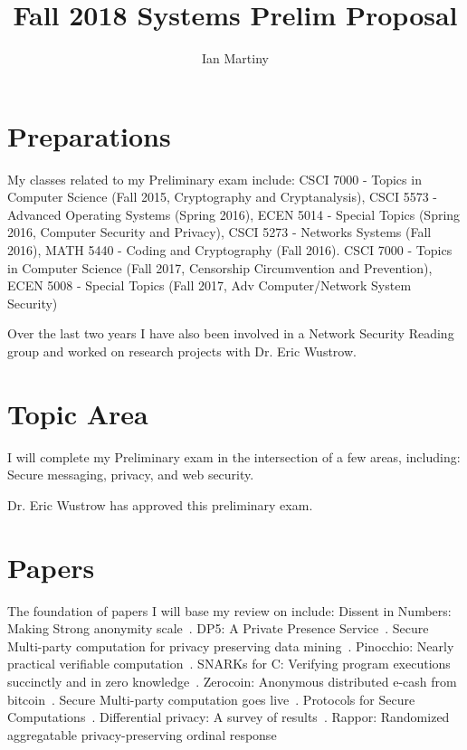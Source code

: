 \documentclass{article}
\title{Fall 2018 Systems Prelim Proposal}
\author{Ian Martiny}
\begin{document}
\maketitle
\section{Preparations}
My classes related to my Preliminary exam include: CSCI 7000 - Topics in
Computer Science (Fall 2015, Cryptography and Cryptanalysis), CSCI 5573 -
Advanced Operating Systems (Spring 2016), ECEN 5014 - Special Topics (Spring
2016, Computer Security and Privacy), CSCI 5273 - Networks Systems (Fall 2016),
MATH 5440 - Coding and Cryptography (Fall 2016). CSCI 7000 - Topics in Computer
Science (Fall 2017, Censorship Circumvention and Prevention), ECEN 5008 -
Special Topics (Fall 2017, Adv Computer/Network System Security)

Over the last two years I have also been involved in a Network Security Reading
group and worked on research projects with Dr. Eric Wustrow.

\section{Topic Area}
I will complete my Preliminary exam in the intersection of a few areas,
including: Secure messaging, privacy, and web security.

Dr. Eric Wustrow has approved this preliminary exam.

\section{Papers}
The foundation of papers I will base my review on include: Dissent in Numbers:
  Making Strong anonymity scale~\cite{wolinsky2012dissent}. DP5: A Private
  Presence Service~\cite{borisov2015dp5}. Secure Multi-party computation for
  privacy preserving data mining~\cite{lindell2005secure}. Pinocchio: Nearly
  practical verifiable computation~\cite{parno2016pinocchio}. SNARKs for C:
  Verifying program executions succinctly and in zero
  knowledge~\cite{ben2013snarks}. Zerocoin: Anonymous distributed e-cash from
  bitcoin~\cite{miers2013zerocoin}. Secure Multi-party computation goes
  live~\cite{bogetoft2009secure}. Protocols for Secure
  Computations~\cite{yao1982protocols}. Differential privacy: A survey of
  results~\cite{dwork2008differential}. Rappor: Randomized aggregatable privacy-preserving ordinal response~\cite{erlingsson2014rappor}



\end{document}
